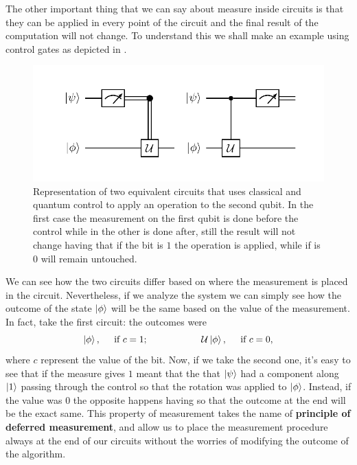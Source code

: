 The other important thing that we can say about measure inside circuits is that they can be applied in every point of the circuit and the final result of the computation will not change. To understand this we shall make an example using control gates as depicted in .
\begin{figure}[t]
    \centering
    \includegraphics[width=\textwidth]{Immagini/ControlEquivalence.pdf}
    \caption
    {
        Representation of two equivalent circuits that uses classical and quantum control to apply an operation to the second qubit. In the first case the measurement on the first qubit is done before the control while in the other is done after, still the result will not change having that if the bit is $1$ the operation is applied, while if is $0$ will remain untouched.
    }
    \label{fig:ControlEquivalence}
\end{figure}
We can see how the two circuits differ based on where the measurement is placed in the circuit. Nevertheless, if we analyze the system we can simply see how the outcome of the state $\ket{\phi}$ will be the same based on the value of the measurement. In fact, take the first circuit: the outcomes were
\begin{equation}
    \ket{\phi}, \hspace{0.5cm} \text{if }c=1; \hspace{2cm} \mathcal{U}\ket{\phi}, \hspace{0.5cm} \text{if }c=0,
\end{equation}
where $c$ represent the value of the bit. Now, if we take the second one, it's easy to see that if the measure gives $1$ meant that the that $\ket{\psi}$ had a component along $\ket{1}$ passing through the control so that the rotation was applied to $\ket{\phi}$. Instead, if the value was $0$ the opposite happens having so that the outcome at the end will be the exact same. This property of measurement takes the name of \textbf{principle of deferred measurement}, and allow us to place the measurement procedure always at the end of our circuits without the worries of modifying the outcome of the algorithm.
